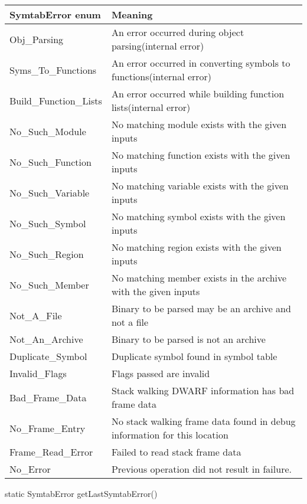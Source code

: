 \begin{apient}
\begin{center}
    \begin{tabular}{ll}
        \toprule
        SymtabError enum& Meaning\\
        \midrule
     Obj\_Parsing & An error occurred during object parsing(internal error)\\
     Syms\_To\_Functions & An error occurred in converting symbols to functions(internal error)\\
     Build\_Function\_Lists & An error occurred while building function lists(internal error)\\
     No\_Such\_Module & No matching module exists with the given inputs\\
     No\_Such\_Function & No matching function exists with the given inputs\\
     No\_Such\_Variable & No matching variable exists with the given inputs\\
     No\_Such\_Symbol & No matching symbol exists with the given inputs\\
     No\_Such\_Region & No matching region exists with the given inputs\\
     No\_Such\_Member & No matching member exists in the archive with the given inputs\\
     Not\_A\_File & Binary to be parsed may be an archive and not a file\\
     Not\_An\_Archive & Binary to be parsed is not an archive\\
     Duplicate\_Symbol & Duplicate symbol found in symbol table\\
     Invalid\_Flags & Flags passed are invalid\\
     Bad\_Frame\_Data & Stack walking DWARF information has bad frame data\\
     No\_Frame\_Entry & No stack walking frame data found in debug information for this location\\
     Frame\_Read\_Error & Failed to read stack frame data\\
     No\_Error & Previous operation did not result in failure.\\
     \bottomrule
 \end{tabular}
 \end{center}

\begin{apient}
static SymtabError getLastSymtabError()
\end{apient}


\end{apient}
